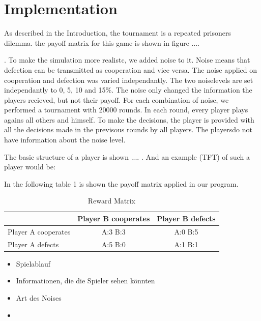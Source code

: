 \documentclass[11pt,twoside]{article}
\begin{document}
\pagestyle{fancy}

\section{Implementation}

As described in the Introduction, the tournament is a repeated prisoners dilemma. the payoff matrix for this game is shown in figure ....

. To make the simulation more realistc, we added noise to it. Noise means that defection can be transmitted as cooperation and vice versa. The noise applied on cooperation and defection was varied independantly. The two noiselevels are set independantly to 0, 5, 10 and 15\%. The noise only changed the information the players recieved, but not their payoff. For each combination of noise, we performed a tournament with 20000 rounds. In each round, every player plays agains all others and himself. To make the decisions, the player is provided with all the decisions made in the previsous rounds by all players. The playersdo not have information about the noise level. 

The basic structure of a player is shown .... . And an example (TFT) of such a player would be:


In the following table 1 is shown the payoff matrix applied in our program.

\begin{table}[h]

 \begin{center}
\caption{Reward Matrix} \vspace{3mm}
\begin{tabular}{|l|c|c|}

\hline
   & Player B cooperates & Player B defects \\
  \hline
  Player A cooperates & A:3 B:3 & A:0 B:5 \\
 \hline
  Player A defects & A:5 B:0 &A:1 B:1 \\
 \hline
\end{tabular}
 \end{center}
\end{table}


\begin{itemize}
\item Spielablauf
\item Informationen, die die Spieler sehen könnten
\item Art des Noises
\item 
\end{itemize}
\end{document}

